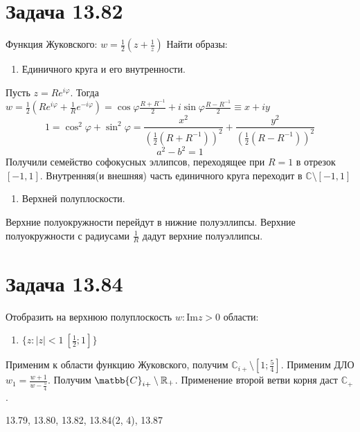 \documentclass[11pt]{article}
\begin{document}
\section{Задача 13.82}
\label{sec:org95f87d2}
Функция Жуковского: \(w = \frac{1}2\left(z + \frac{1}{z}\right)\)
Найти образы:
\begin{enumerate}
\item Единичного круга и его внутренности.
\end{enumerate}
Пусть \(z = Re^{i\varphi}\). Тогда \(w = \frac{1}2\left(Re^{i\varphi} + \frac{1}Re^{-i\varphi}\right)
= \cos\varphi\frac{R + R^{-1}}2 + i\sin\varphi\frac{R - R^{-1}}2 \equiv x + iy\)
$$1 = \cos^2\varphi + \sin^2\varphi = \frac{x^2}{(\frac{1}2(R+R^{-1}))^2} + \frac{y^2}{(\frac{1}2(R - R^{-1}))^2}$$
$$a^2 - b^2 = 1$$
Получили семейство софокусных эллипсов, переходящее при \(R = 1\) в отрезок \([-1, 1]\).
Внутренняя(и внешняя) часть единичного круга переходит в \(\mathbb{C} \setminus [-1, 1]\)
\begin{enumerate}
\item Верхней полуплоскости.
\end{enumerate}
Верхние полуокружности перейдут в нижние полуэллипсы. Верхние полуокружности с радиусами \(\frac{1}{R}\) дадут верхние
полуэллипсы.
\section{Задача 13.84}
\label{sec:org95aeb64}
Отобразить на верхнюю полуплоскость \({w: \mathrm{Im} z > 0}\) области:
\begin{enumerate}
\item \(\{z: |z| < 1 \ \left[\frac{1}2; 1\right]\}\)
\end{enumerate}
Применим к области функцию Жуковского, получим \(\mathbb{C}_{i+} \setminus \left[1; \frac{5}4\right]\).
Применим ДЛО \(w_1 = \frac{w + 1}{w - \frac{5}4}\). Получим \(\matbb{C}_{i+} \setminus \mathbb{R}_+\).
Применение второй ветви корня даст \(\mathbb{C}_+\).

13.79, 13.80, 13.82, 13.84(2, 4), 13.87
\end{document}
